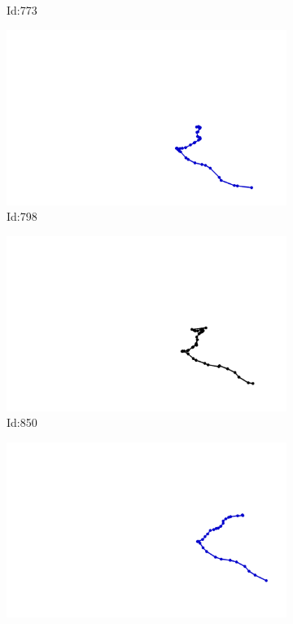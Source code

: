 \documentclass[12pt,twoside]{report}
\begin{document}
\begin{figure}
\begin{subfigure}[b]{0.20\textwidth}
\caption{Id:773}
\end{subfigure}
\begin{subfigure}[b]{0.20\textwidth}
\centering
\includegraphics[width=\textwidth]{../trajectories/798.png}
\caption{Id:798}
\end{subfigure}
\begin{subfigure}[b]{0.20\textwidth}
\centering
\includegraphics[width=\textwidth]{../trajectories/850.png}
\caption{Id:850}
\end{subfigure}
\begin{subfigure}[b]{0.20\textwidth}
\centering
\includegraphics[width=\textwidth]{../trajectories/973.png}

\end{subfigure}
\end{figure}
\end{document}
